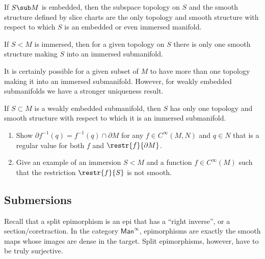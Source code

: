 \begin{thm}\label{thm 5.31 Lee}
    If $S\sub M$ is embedded, then the subspace topology on $S$ and the smooth structure defined by slice charts are the only topology and smooth structure with respect to which $S$ is an embedded or even immersed manifold.
\end{thm}

\begin{thm}\label{thm 5.32 Lee}
    If $S< M$ is immersed, then for a given topology on $S$ there is only one smooth structure making $S$ into an immersed submanifold.
\end{thm}

It is certainly possible for a given subset of $M$ to have more than one topology making it into an immersed submanifold. However, for weakly embedded submanifolds we have a stronger uniqueness result.

\begin{thm}\label{thm 5.33 Lee}
    If $S\subset M$ is a weakly embedded submanifold, then $S$ has only one topology and smooth structure with respect to which it is an immersed submanifold.
\end{thm}


\begin{xca}
\begin{enumerate}
    \item Show $\partial f^{-1}(q)=f^{-1}(q)\cap \partial M$ for any $f\in C^\infty(M,N)$ and $q\in N$ that is a regular value for both $f$ and $\restr{f}{\partial M}$.
    \item Give an example of an immersion $S<M$ and a function $f\in C^\infty(M)$ such that the restriction $\restr{f}{S}$ is not smooth.
\end{enumerate}

\end{xca}




\subsection{Submersions}\label{sec: submersions}

Recall that a split epimorphism is an epi that has a ``right inverse'', or a section/coretraction. In the category $\mathsf{Man}^\infty$, epimorphisms are exactly the smooth maps whose images are dense in the target. Split epimorphisms, however, have to be truly surjective.

